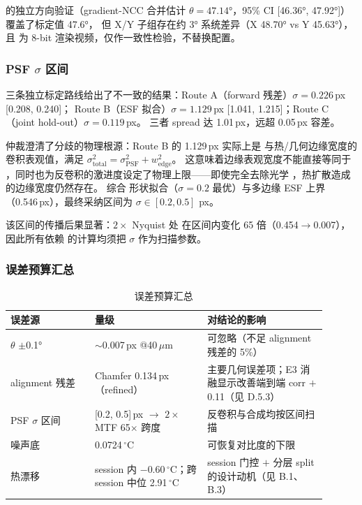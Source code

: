  的独立方向验证（gradient-NCC 合并估计 \(\theta = 47.14°\)，95\% CI [46.36°, 47.92°]）覆盖了标定值 47.6°，
但 X/Y 子组存在约 3° 系统差异（X 48.70° vs Y 45.63°），且  为 8-bit 渲染视频，仅作一致性检验，不替换配置。

\subsubsection{PSF \texorpdfstring{\(\sigma\)}{sigma} 区间}

三条独立标定路线给出了不一致的结果：Route A（forward 残差）\(\sigma = 0.226\)\,px [0.208, 0.240]；
Route B（ESF 拟合）\(\sigma = 1.129\)\,px [1.041, 1.215]；Route C（joint hold-out）\(\sigma = 0.119\)\,px。
三者 spread 达 1.01\,px，远超 0.05\,px 容差。

 仲裁澄清了分歧的物理根源：Route B 的 1.129\,px 实际上是  与热/几何边缘宽度的卷积表观值，满足 \(\sigma_{\mathrm{total}}^2 = \sigma_{\mathrm{PSF}}^2 + w_{\mathrm{edge}}^2\)。
这意味着边缘表观宽度不能直接等同于 ，同时也为反卷积的激进度设定了物理上限——即使完全去除光学 ，热扩散造成的边缘宽度仍然存在。
综合  形状拟合（\(\sigma = 0.2\) 最优）与多边缘 ESF 上界（0.546\,px），最终采纳区间为 \(\sigma \in [0.2, 0.5]\)  px。

该区间的传播后果显著：\(2\times\) Nyquist 处  在区间内变化 65 倍（0.454\(\rightarrow\)0.007），因此所有依赖  的计算均须把 \(\sigma\) 作为扫描参数。

\subsubsection{误差预算汇总}

\begin{table}[ht]
  \centering
  \caption{误差预算汇总}
  \label{tab:error-budget}
  \small
  \begin{tabular}{p{0.24\linewidth}p{0.32\linewidth}p{0.34\linewidth}}
    \toprule
    误差源 & 量级 & 对结论的影响 \\
    \midrule
    \(\theta\) \(\pm\)0.1° & \(\sim\)0.007\,px @40\,\(\mu\)m & 可忽略（不足 alignment 残差的 5\%） \\
    alignment 残差 & Chamfer 0.134\,px（refined） & 主要几何误差项；E3 消融显示改善端到端 corr \(+\)0.11（见 D.5.3） \\
    PSF \(\sigma\) 区间 & [0.2, 0.5]\,px \(\rightarrow\) \(2\times\) MTF 65\(\times\) 跨度 & 反卷积与合成均按区间扫描 \\
    噪声底 & 0.0724\,\(^\circ\)C & 可恢复对比度的下限 \\
    热漂移 & session 内 \(-0.60\)\,\(^\circ\)C；跨 session 中位 2.91\,\(^\circ\)C & session 门控 \(+\) 分层 split 的设计动机（见 B.1、B.3） \\
    \bottomrule
  \end{tabular}
\end{table}
